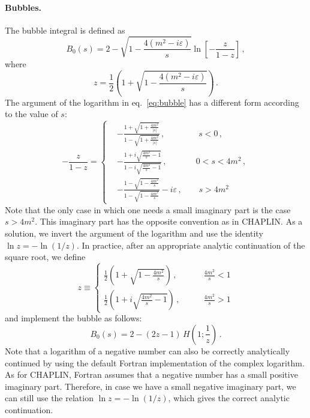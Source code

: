 \documentclass[12pt]{article}
\begin{document}
\paragraph{Bubbles.} The bubble integral is defined as
\begin{equation}
  \label{eq:bubble}
  B_0(s)=2 -\sqrt{1-\frac{4(m^2-i\varepsilon)}{s}}\ln\left[-\frac{z}{1-z}\right]\,,
\end{equation}
where 
\begin{equation}
  \label{eq:z}
  z=\frac{1}{2}\left(1+\sqrt{1-\frac{4(m^2-i\varepsilon)}{s}}\right)\,.
\end{equation}
The argument of the logarithm in eq.~\eqref{eq:bubble} has a different
form according to the value of $s$:
\begin{equation}
  \label{eq:z-omz}
  -\frac{z}{1-z} = \left\{
    \begin{split}
      &-\frac{1+\sqrt{1+\frac{4m^2}{|s|}}}{1-\sqrt{1+\frac{4m^2}{|s|}}}\,,\qquad \qquad s<0\,,\\
        & -\frac{1+i\sqrt{\frac{4m^2}{s}-1}}{1-i\sqrt{\frac{4m^2}{s}-1}}\,,\qquad \quad\>\> 0<s<4m^2\,,\\
        &
        -\frac{1-\sqrt{1-\frac{4m^2}{s}}}{1-\sqrt{1-\frac{4m^2}{s}}}-i\varepsilon\,,\qquad
        s>4m^2
    \end{split}
\right.
\end{equation}
Note that the only case in which one needs a small imaginary part is
the case $s>4m^2$. This imaginary part has the opposite convention as
in CHAPLIN. As a solution, we invert the argument of the logarithm and
use the identity $\ln z = -\ln(1/z)$. In practice, after an appropriate analytic
continuation of the square root, we define
\begin{equation}
  \label{eq:z-implemented}
  z \equiv \left\{\begin{split}
      \frac{1}{2}\left(1+\sqrt{1-\frac{4m^2}{s}}\right)\,,& \qquad \frac{4m^2}{s}<1\\
      \frac{1}{2}\left(1+i\sqrt{\frac{4m^2}{s}-1}\right)\,,& \qquad \frac{4m^2}{s}>1
    \end{split}
    \right.
  \end{equation}
and implement the bubble as follows:
\begin{equation}
  \label{eq:bubble-implemented}
  B_0(s)=
      2 -(2 z-1) \,H\left(1;\frac{1}{z}\right) \,.
\end{equation}
Note that a logarithm of a negative number can also be correctly
analytically continued by using the default Fortran implementation
of the complex logarithm. As for CHAPLIN, Fortran assumes that a
negative number has a small positive imaginary part. Therefore, in
case we have a small negative imaginary part, we can still use the
relation $\ln z = -\ln(1/z)$, which gives the correct analytic continuation.
\end{document}

